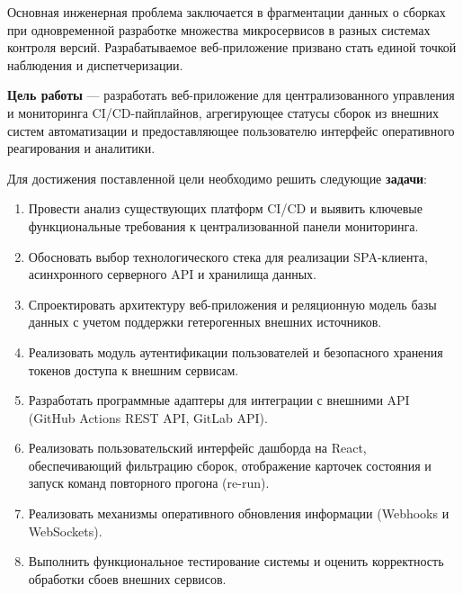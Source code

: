 Основная инженерная проблема заключается в фрагментации данных о сборках при одновременной разработке множества микросервисов в разных системах контроля версий. Разрабатываемое веб-приложение призвано стать единой точкой наблюдения и диспетчеризации.

\textbf{Цель работы} --- разработать веб-приложение для централизованного управления и мониторинга CI/CD-пайплайнов, агрегирующее статусы сборок из внешних систем автоматизации и предоставляющее пользователю интерфейс оперативного реагирования и аналитики.

Для достижения поставленной цели необходимо решить следующие \textbf{задачи}:
\begin{enumerate}
    \item Провести анализ существующих платформ CI/CD и выявить ключевые функциональные требования к централизованной панели мониторинга.
    \item Обосновать выбор технологического стека для реализации SPA-клиента, асинхронного серверного API и хранилища данных.
    \item Спроектировать архитектуру веб-приложения и реляционную модель базы данных с учетом поддержки гетерогенных внешних источников.
    \item Реализовать модуль аутентификации пользователей и безопасного хранения токенов доступа к внешним сервисам.
    \item Разработать программные адаптеры для интеграции с внешними API (GitHub Actions REST API, GitLab API).
    \item Реализовать пользовательский интерфейс дашборда на React, обеспечивающий фильтрацию сборок, отображение карточек состояния и запуск команд повторного прогона (re-run).
    \item Реализовать механизмы оперативного обновления информации (Webhooks и WebSockets).
    \item Выполнить функциональное тестирование системы и оценить корректность обработки сбоев внешних сервисов.
\end{enumerate}

